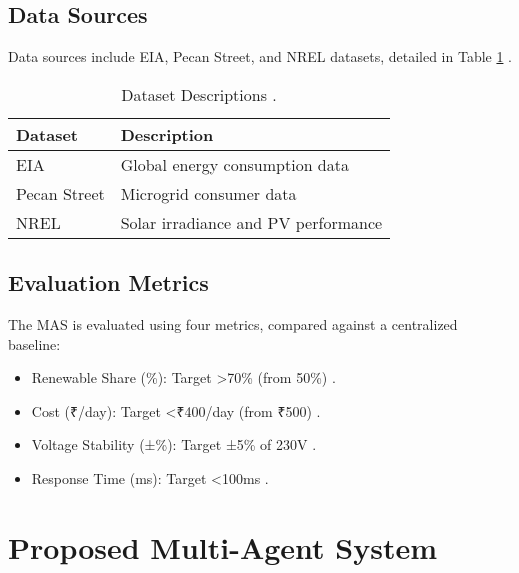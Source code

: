 \documentclass[12pt]{report}
\begin{document}
\section{Data Sources}
\begin{doublespace}
Data sources include EIA, Pecan Street, and NREL datasets, detailed in Table \ref{tab:data_sources} \cite{EIA2020, PecanStreet2021, NREL2025}.
\end{doublespace}
\begin{table}[h]
    \centering
    \caption{Dataset Descriptions \cite{MNRE2023}.}
    \label{tab:data_sources}
    \begin{tabular}{ll}
        \toprule
        \textbf{Dataset} & \textbf{Description} \\
        \midrule
        EIA & Global energy consumption data \\
        Pecan Street & Microgrid consumer data \\
        NREL & Solar irradiance and PV performance \\
        \bottomrule
    \end{tabular}
\end{table}

\section{Evaluation Metrics}
\begin{doublespace}
The MAS is evaluated using four metrics, compared against a centralized baseline:
\begin{itemize}
    \item Renewable Share (\%): Target >70\% (from 50\%) \cite{MNRE2023}.
    \item Cost (₹/day): Target <₹400/day (from ₹500) \cite{MNRE2023}.
    \item Voltage Stability (±\%): Target ±5\% of 230V \cite{MNRE2023}.
    \item Response Time (ms): Target <100ms \cite{Zhang2021}.
\end{itemize}
\end{doublespace}

\chapter{Proposed Multi-Agent System}
\thispagestyle{empty}
\end{document}
